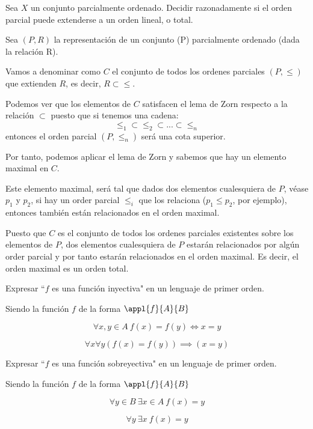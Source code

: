 \begin{problem}[5]
Sea $X$ un conjunto parcialmente ordenado. Decidir razonadamente si el orden parcial puede
extenderse a un orden lineal, o total.
\solution


Sea $(P,R)$ la representación de un conjunto (P) parcialmente ordenado (dada la relación R).

Vamos a denominar como $C$ el conjunto de todos los ordenes parciales $(P,\leq)$ que extienden $R$, es decir, $R \subset \leq$.

Podemos ver que los elementos de $C$ satisfacen el lema de Zorn respecto a la relación $\subset$ puesto que si tenemos una cadena:
\[\leq_1 \subset \leq_2 \subset ... \subset \leq_n\]
entonces el orden parcial $(P,\leq_n)$ será una cota superior.

Por tanto, podemos aplicar el lema de Zorn y sabemos que hay un elemento maximal en $C$.

Este elemento maximal, será tal que dados dos elementos cualesquiera de $P$, véase $p_1$ y $p_2$, si hay un order parcial $\leq_i$ que los relaciona ($p_1 \leq p_2$, por ejemplo), entonces también están relacionados en el orden maximal.

Puesto que $C$ es el conjunto de todos los ordenes parciales existentes sobre los elementos de $P$, dos elementos cualesquiera de $P$ estarán relacionados por algún order parcial y por tanto estarán relacionados en el orden maximal. Es decir, el orden maximal es un orden total.
\end{problem}

\begin{problem}[6]
Expresar ``$f$ es una funci\'on inyectiva"  en un lenguaje de primer orden.
\solution

Siendo la función $f$ de la forma $\appl{f}{A}{B}$

\[\forall x,y \in A \ f(x)=f(y) \iff x=y \]

\[ \forall x \forall y (f(x)=f(y)) \implies (x = y) \]

\end{problem}

\begin{problem}[7]
Expresar ``$f$ es una funci\'on sobreyectiva"  en un lenguaje de primer orden.
\solution


Siendo la función $f$ de la forma $\appl{f}{A}{B}$

\[\forall y \in B \ \exists x \in A \ f(x)=y\]

\[ \forall y \ \exists x \ f(x) = y \]

\end{problem}

